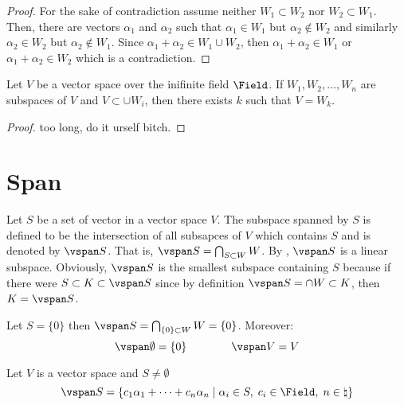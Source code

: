 \begin{proof}
    For the sake of contradiction assume neither \(W_1 \subset W_2\) nor \(W_2 \subset W_1\). Then, there are vectors \(\alpha_1\) and \(\alpha_2\) such that \(\alpha_1 \in W_1\) but \(\alpha_2 \notin W_2\) and similarly \(\alpha_2 \in W_2\) but \(\alpha_2 \notin W_1\). Since \(\alpha_1 + \alpha_2 \in W_1 \cup W_2\), then \(\alpha_1 + \alpha_2 \in W_1\) or \(\alpha_1 + \alpha_2 \in W_2\) which is a contradiction.
\end{proof}

\begin{theorem}
    Let \(V\) be a vector space over the inifinite field \(\Field\). If \(W_1,W_2,\dots, W_n\) are subspaces of \(V\) and \(V \subset \cup W_i\), then there exists \(k\) such that \(V = W_k\).
\end{theorem}

\begin{proof}
    too long, do it urself bitch.
\end{proof}

\section{Span}

\begin{definition}
    Let \(S\) be a set of vector in a vector space \(V\). The subspace spanned by \(S\) is defined to be the intersection of all subsapces of \(V\) which contains \(S\) and is denoted by \(\vspan S\). That is, \(\vspan S = \bigcap_{S \subset W} W \). By , \(\vspan S\) is a linear subspace. Obviously, \(\vspan S\) is the smallest subspace containing \(S\) because if there were \(S \subset K \subset \vspan S\) since by definition \(\vspan S = \cap W \subset K\), then \(K = \vspan S\).
\end{definition}

\begin{example}
    Let \(S = \{0\}\) then \(\vspan S =  \bigcap_{\{0\} \subset W} W = \{0\}\). Moreover:
    \begin{equation*}
        \vspan \emptyset = \{0\} \qquad \qquad \vspan V = V
    \end{equation*}
\end{example}

\begin{theorem} \label{th:LinearitySpan}
    Let \(V\) is a vector space and \( S \neq \emptyset\)
    \begin{equation*}
        \vspan S = \left \{ c_1 \alpha_1 + \dots + c_n \alpha_n \; \middle| \; \alpha_i \in S, \; c_i \in \Field, \; n \in \natural \right \}
    \end{equation*}
\end{theorem}

